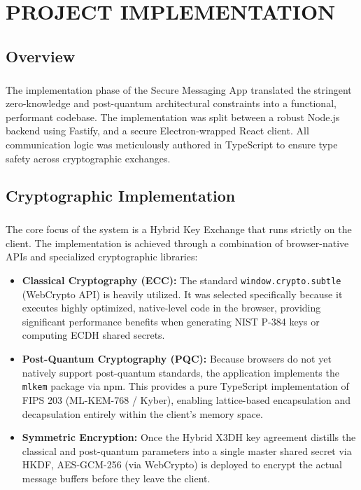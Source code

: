 \chapter{\MakeUppercase{Project Implementation}}

\section{Overview}
\paragraph{}
The implementation phase of the Secure Messaging App translated the stringent zero-knowledge and post-quantum architectural constraints into a functional, performant codebase. The implementation was split between a robust Node.js backend using Fastify, and a secure Electron-wrapped React client. All communication logic was meticulously authored in TypeScript to ensure type safety across cryptographic exchanges.

\section{Cryptographic Implementation}
\paragraph{}
The core focus of the system is a Hybrid Key Exchange that runs strictly on the client. The implementation is achieved through a combination of browser-native APIs and specialized cryptographic libraries:

\begin{itemize}
    \item \textbf{Classical Cryptography (ECC):} The standard \texttt{window.crypto.subtle} (WebCrypto API) is heavily utilized. It was selected specifically because it executes highly optimized, native-level code in the browser, providing significant performance benefits when generating NIST P-384 keys or computing ECDH shared secrets.
    \item \textbf{Post-Quantum Cryptography (PQC):} Because browsers do not yet natively support post-quantum standards, the application implements the \texttt{mlkem} package via npm. This provides a pure TypeScript implementation of FIPS 203 (ML-KEM-768 / Kyber), enabling lattice-based encapsulation and decapsulation entirely within the client's memory space.
    \item \textbf{Symmetric Encryption:} Once the Hybrid X3DH key agreement distills the classical and post-quantum parameters into a single master shared secret via HKDF, AES-GCM-256 (via WebCrypto) is deployed to encrypt the actual message buffers before they leave the client.
\end{itemize}

